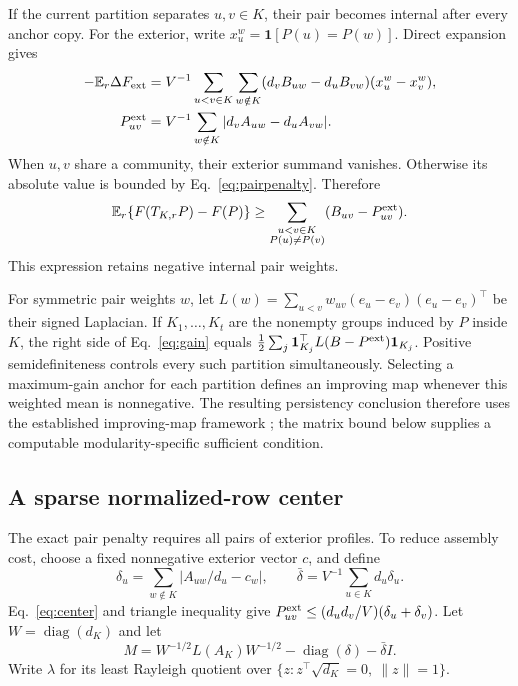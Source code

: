 \documentclass[sigconf,anonymous,review]{acmart}
\newcommand{\1}{\mathbf{1}}
\newcommand{\E}{\mathbb{E}}
\newcommand{\diag}{\operatorname{diag}}
\begin{document}
If the current partition separates $u,v\in K$, their pair becomes internal
after every anchor copy. For the exterior, write
$x_u^w=\1[P(u)=P(w)]$. Direct expansion gives
\begin{align}
 -\E_r\Delta F_{\rm ext}
 &=V^{-1}\sum_{u<v\in K}\sum_{w\notin K}
 (d_vB_{uw}-d_uB_{vw})(x_u^w-x_v^w),\label{eq:expansion}\\
 P_{uv}^{\rm ext}
 &=V^{-1}\sum_{w\notin K}|d_vA_{uw}-d_uA_{vw}|.\label{eq:pairpenalty}
\end{align}
When $u,v$ share a community, their exterior summand vanishes. Otherwise its
absolute value is bounded by Eq.~\eqref{eq:pairpenalty}. Therefore
\begin{equation}
 \E_r\{F(T_{K,r}P)-F(P)\}
 \geq\sum_{\substack{u<v\in K\\P(u)\ne P(v)}}(B_{uv}-P_{uv}^{\rm ext}).
 \label{eq:gain}
\end{equation}
This expression retains negative internal pair weights.

For symmetric pair weights $w$, let
$L(w)=\sum_{u<v}w_{uv}(e_u-e_v)(e_u-e_v)^\top$ be their signed Laplacian.
If $K_1,\ldots,K_t$ are the nonempty groups induced by $P$ inside $K$, the
right side of Eq.~\eqref{eq:gain} equals
$\frac 12\sum_j\1_{K_j}^\top L(B-P^{\rm ext})\1_{K_j}$.
Positive semidefiniteness controls every such partition simultaneously.
Selecting a maximum-gain anchor for each partition defines an improving map
whenever this weighted mean is nonnegative. The resulting persistency conclusion
therefore uses the established improving-map framework
\cite{lange2019combinatorial}; the matrix bound below supplies a computable
modularity-specific sufficient condition.

\subsection{A sparse normalized-row center}
The exact pair penalty requires all pairs of exterior profiles. To reduce
assembly cost, choose a fixed nonnegative exterior vector $c$, and define
\begin{equation}
 \delta_u=\sum_{w\notin K}|A_{uw}/d_u-c_w|,
 \qquad \bar\delta=V^{-1}\sum_{u\in K}d_u\delta_u.
 \label{eq:center}
\end{equation}
Eq.~\eqref{eq:center} and triangle inequality give
$P_{uv}^{\rm ext}\leq(d_ud_v/V)(\delta_u+\delta_v)$.
Let $W=\diag(d_K)$ and let
\begin{equation}
 M=W^{-1/2}L(A_K)W^{-1/2}-\diag(\delta)-\bar\delta I.
 \label{eq:matrix}
\end{equation}
Write $\lambda$ for its least Rayleigh quotient over
$\{z:z^\top\sqrt{d_K}=0,\ \|z\|=1\}$.
\end{document}
